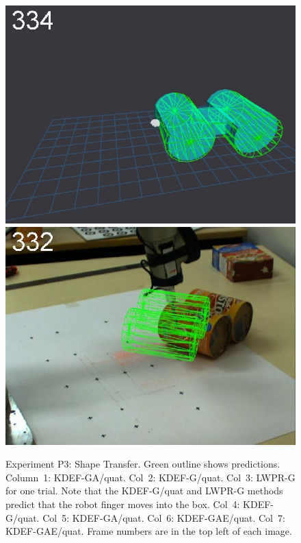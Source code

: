 \begin{figure}[t]
{\includegraphics[width=\imgCXwid]{./C5_3exp_6_5}
\includegraphics[width=\imgCXwid]{./C2_3exp_75_5}
}

\caption {Experiment P3: Shape Transfer. Green outline shows predictions. Column~1: KDEF-GA/quat.
  Col~2: KDEF-G/quat. Col~3: LWPR-G for one trial.  Note that the
  KDEF-G/quat and LWPR-G methods predict that the robot finger moves
  into the box.  Col~4: KDEF-G/quat. Col~5: KDEF-GA/quat. Col~6:
  KDEF-GAE/quat. Col~7: KDEF-GAE/quat. Frame numbers are in
  the top left of each image.  }
\label{fig:ExperimentStransfer}
\end{figure}



